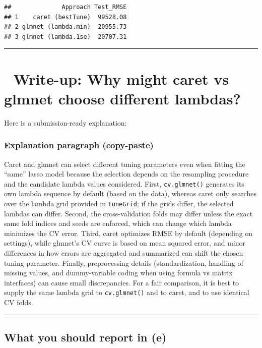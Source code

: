 \documentclass[
]{article}
\begin{document}
\begin{verbatim}
##              Approach Test_RMSE
## 1    caret (bestTune)  99528.08
## 2 glmnet (lambda.min)  20955.73
## 3 glmnet (lambda.1se)  20707.31
\end{verbatim}

\begin{center}\rule{0.5\linewidth}{0.5pt}\end{center}

\section{🧠 Write-up: Why might caret vs glmnet choose different
lambdas?}\label{write-up-why-might-caret-vs-glmnet-choose-different-lambdas}

Here is a submission-ready explanation:

\subsubsection{Explanation paragraph
(copy-paste)}\label{explanation-paragraph-copy-paste}

Caret and glmnet can select different tuning parameters even when
fitting the ``same'' lasso model because the selection depends on the
resampling procedure and the candidate lambda values considered. First,
\texttt{cv.glmnet()} generates its own lambda sequence by default (based
on the data), whereas caret only searches over the lambda grid provided
in \texttt{tuneGrid}; if the grids differ, the selected lambdas can
differ. Second, the cross-validation folds may differ unless the exact
same fold indices and seeds are enforced, which can change which lambda
minimizes the CV error. Third, caret optimizes RMSE by default
(depending on settings), while glmnet's CV curve is based on mean
squared error, and minor differences in how errors are aggregated and
summarized can shift the chosen tuning parameter. Finally, preprocessing
details (standardization, handling of missing values, and dummy-variable
coding when using formula vs matrix interfaces) can cause small
discrepancies. For a fair comparison, it is best to supply the same
lambda grid to \texttt{cv.glmnet()} and to caret, and to use identical
CV folds.

\begin{center}\rule{0.5\linewidth}{0.5pt}\end{center}

\subsection{What you should report in
(e)}\label{what-you-should-report-in-e}
\end{document}

